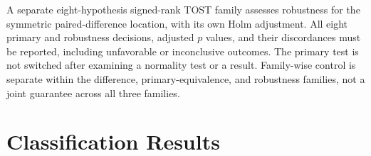 \documentclass[10pt,conference]{IEEEtran}
\begin{document}
A separate eight-hypothesis signed-rank TOST family assesses robustness for
the symmetric paired-difference location, with its own Holm adjustment. All
eight primary and robustness decisions, adjusted $p$ values, and their
discordances must be reported, including unfavorable or inconclusive outcomes.
The primary test is not switched after examining a normality test or a result.
Family-wise control is separate within the difference, primary-equivalence,
and robustness families, not a joint guarantee across all three families.

\section{Classification Results}

\begin{table}[t]
\centering
\caption{Test metrics (\%, mean $\mathbin{\pm}$ sample standard deviation).
All neural arms use \vFiveSeeds\ seeds. XGBoost is one deterministic fit.}
\label{tab:accuracy}
\small
{}
\end{table}
\end{document}
